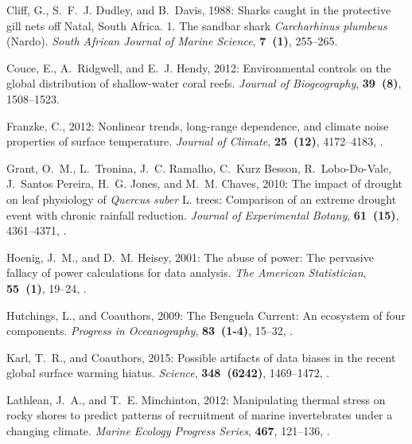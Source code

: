 \documentclass{ametsoc}
\begin{document}
\begin{thebibliography}{23}
Cliff, G., S.~F.~J. Dudley, and B.~Davis, 1988: {Sharks caught in the
  protective gill nets off Natal, South Africa. 1. The sandbar shark
  \textit{Carcharhinus plumbeus} (Nardo)}. \textit{South African Journal of Marine
  Science}, \textbf{7~(1)}, 255--265.

Couce, E., A.~Ridgwell, and E.~J. Hendy, 2012: {Environmental controls on the
  global distribution of shallow-water coral reefs}. \textit{Journal of
  Biogeography}, \textbf{39~(8)}, 1508--1523.

Franzke, C., 2012: {Nonlinear trends, long-range dependence, and climate noise
  properties of surface temperature}. \textit{Journal of Climate},
  \textbf{25~(12)}, 4172--4183, .

Grant, O.~M., L.~Tronina, J.~C. Ramalho, C.~{Kurz Besson}, R.~Lobo-Do-Vale,
  J.~{Santos Pereira}, H.~G. Jones, and M.~M. Chaves, 2010: {The impact of
  drought on leaf physiology of \textit{Quercus suber} L. trees: Comparison of an
  extreme drought event with chronic rainfall reduction}. \textit{Journal of
  Experimental Botany}, \textbf{61~(15)}, 4361--4371, .

Hoenig, J.~M., and D.~M. Heisey, 2001: {The abuse of power: The pervasive
  fallacy of power calculations for data analysis}. \textit{The American
  Statistician}, \textbf{55~(1)}, 19--24, .

Hutchings, L., and Coauthors, 2009: {The Benguela Current: An ecosystem of four
  components}. \textit{Progress in Oceanography}, \textbf{83~(1-4)}, 15--32,
  .

Karl, T.~R., and Coauthors, 2015: {Possible artifacts of data biases in the
  recent global surface warming hiatus}. \textit{Science}, \textbf{348~(6242)},
  1469--1472, .

Lathlean, J.~A., and T.~E. Minchinton, 2012: {Manipulating thermal stress on
  rocky shores to predict patterns of recruitment of marine invertebrates under
  a changing climate}. \textit{Marine Ecology Progress Series}, \textbf{467},
  121--136, .


\end{thebibliography}
\end{document}
